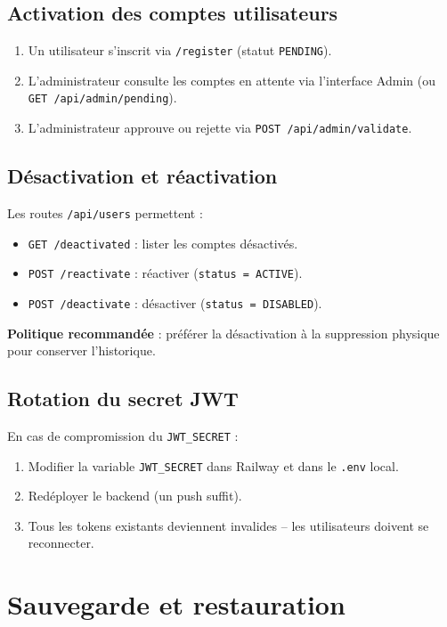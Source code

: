 \documentclass[12pt,a4paper]{report}
\begin{document}
\section{Activation des comptes utilisateurs}
\begin{enumerate}
    \item Un utilisateur s'inscrit via \texttt{/register} (statut \texttt{PENDING}).
    \item L'administrateur consulte les comptes en attente via l'interface Admin (ou \texttt{GET /api/admin/pending}).
    \item L'administrateur approuve ou rejette via \texttt{POST /api/admin/validate}.
\end{enumerate}

\section{Désactivation et réactivation}

Les routes \texttt{/api/users} permettent :
\begin{itemize}
    \item \texttt{GET /deactivated} : lister les comptes désactivés.
    \item \texttt{POST /reactivate} : réactiver (\texttt{status = ACTIVE}).
    \item \texttt{POST /deactivate} : désactiver (\texttt{status = DISABLED}).
\end{itemize}

\textbf{Politique recommandée} : préférer la désactivation à la suppression physique pour conserver l'historique.

\section{Rotation du secret JWT}

En cas de compromission du \texttt{JWT\_SECRET} :
\begin{enumerate}
    \item Modifier la variable \texttt{JWT\_SECRET} dans Railway et dans le \texttt{.env} local.
    \item Redéployer le backend (un push suffit).
    \item Tous les tokens existants deviennent invalides -- les utilisateurs doivent se reconnecter.
\end{enumerate}

\chapter{Sauvegarde et restauration}
\end{document}
